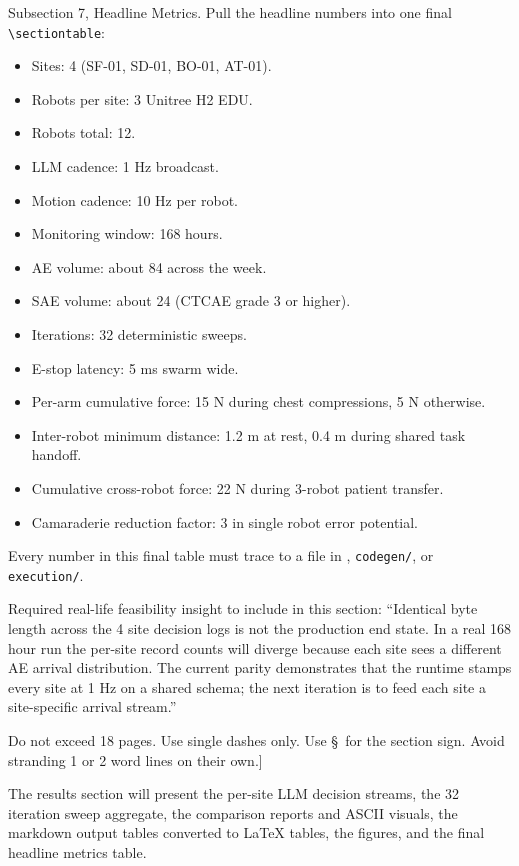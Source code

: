 \begin{sectionaccent}
Subsection 7, Headline Metrics. Pull the headline numbers into one
final \texttt{\textbackslash sectiontable}:
\begin{itemize}
  \item Sites: 4 (SF-01, SD-01, BO-01, AT-01).
  \item Robots per site: 3 Unitree H2 EDU.
  \item Robots total: 12.
  \item LLM cadence: 1 Hz broadcast.
  \item Motion cadence: 10 Hz per robot.
  \item Monitoring window: 168 hours.
  \item AE volume: about 84 across the week.
  \item SAE volume: about 24 (CTCAE grade 3 or higher).
  \item Iterations: 32 deterministic sweeps.
  \item E-stop latency: 5 ms swarm wide.
  \item Per-arm cumulative force: 15 N during chest compressions,
        5 N otherwise.
  \item Inter-robot minimum distance: 1.2 m at rest, 0.4 m during
        shared task handoff.
  \item Cumulative cross-robot force: 22 N during 3-robot patient
        transfer.
  \item Camaraderie reduction factor: 3 in single robot error
        potential.
\end{itemize}
Every number in this final table must trace to a file in
, \texttt{codegen/}, or \texttt{execution/}.

Required real-life feasibility insight to include in this section:
``Identical byte length across the 4 site decision logs is not the
production end state. In a real 168 hour run the per-site record
counts will diverge because each site sees a different AE arrival
distribution. The current parity demonstrates that the runtime
stamps every site at 1 Hz on a shared schema; the next iteration is
to feed each site a site-specific arrival stream.''

Do not exceed 18 pages. Use single dashes only. Use \S\ for the
section sign. Avoid stranding 1 or 2 word lines on their own.]

The results section will present the per-site LLM decision streams,
the 32 iteration sweep aggregate, the comparison reports and ASCII
visuals, the markdown output tables converted to LaTeX tables, the
figures, and the final headline metrics table.


\end{sectionaccent}
